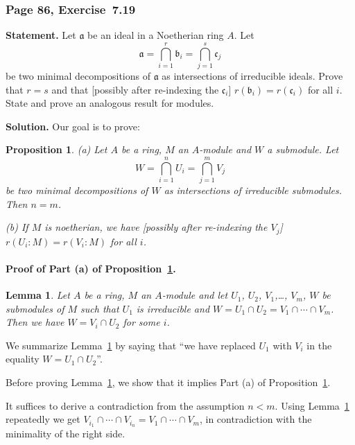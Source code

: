 \documentclass[12pt,letterpaper]{article}%
\newcommand{\mf}{\mathfrak}
\newcommand{\aaa}{\mf a}
\newcommand{\bbb}{\mf b}
\newcommand{\ccc}{\mf c}
\newcommand{\nn}{\noindent}
\newtheorem{lem}[thm]{Lemma}
\newtheorem{prop}[thm]{Proposition}
\begin{document}
\subsubsection{Page 86, Exercise~7.19}%

\textbf{Statement.} Let $\aaa$ be an ideal in a Noetherian ring $A$. Let 
$$
\mathfrak{a}=\bigcap_{i=1}^r\mathfrak{b}_i=\bigcap_{j=1}^s\mathfrak{c}_j
$$ 
be two minimal decompositions of $\aaa$ as intersections of irreducible ideals. Prove that $r=s$ and that [possibly after re-indexing the $\ccc_i$] $r(\bbb_i)=r(\ccc_i)$ for all $i$. State and prove an analogous result for modules.

\nn\textbf{Solution.} Our goal is to prove:

\begin{prop}\label{719P1}
(a) Let $A$ be a ring, $M$ an $A$-module and $W$ a submodule. Let 
$$
W=\bigcap_{i=1}^nU_i=\bigcap_{j=1}^mV_j
$$ 
be two minimal decompositions of $W$ as intersections of irreducible submodules. Then $n=m$.

\nn(b) If $M$ is noetherian, we have [possibly after re-indexing the $V_j$] $r(U_i:M)=r(V_i:M)$ for all $i$.
\end{prop}

\paragraph{Proof of Part (a) of Proposition~\ref{719P1}.}%

\begin{lem}\label{719L2}
Let $A$ be a ring, $M$ an $A$-module and let $U_1$, $U_2$, $V_1$,\dots, $V_m$, $W$ be submodules of $M$ such that $U_1$ is irreducible and $W=U_1\cap U_2=V_1\cap\cdots\cap V_m$. Then we have $W=V_i\cap U_2$ for some $i$. 
\end{lem} 

We summarize Lemma~\ref{719L2} by saying that ``we have replaced $U_1$ with $V_i$ in the equality $W=U_1\cap U_2$''. 

Before proving Lemma~\ref{719L2}, we show that it implies Part (a) of Proposition~\ref{719P1}. 

It suffices to derive a contradiction from the assumption $n<m$. Using Lemma~\ref{719L2} repeatedly we get $V_{i_1}\cap\cdots\cap V_{i_n}=V_1\cap\cdots\cap V_m$, in contradiction with the minimality of the right side.
\end{document}
